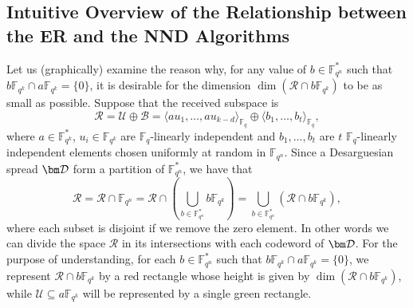 \documentclass{article}
\newcommand{\Fq}{\mathbb{F}_{q}}
\newcommand{\Fqn}{\mathbb{F}_{q^n}}
\newcommand{\Fqk}{\mathbb{F}_{q^k}}
\newcommand{\calB}{\mathcal{B}}
\newcommand{\calD}{\mathcal{D}}
\newcommand{\calR}{\mathcal{R}}
\newcommand{\calU}{\mathcal{U}}
\newcommand{\Span}[2]{\langle #2 \rangle_{#1}}
\begin{document}
\subsection{Intuitive Overview of the Relationship between the ER and the NND Algorithms}
\label{app: visual expl}
Let us (graphically) examine the reason why, for any value of $b \in \Fqn^*$ such that $b\Fqk\cap a\Fqk=\{0\}$, it is desirable for the dimension $\dim(\calR \cap b \Fqk)$ to be as small as possible. Suppose that the received subspace is $$\mathcal{R}=\calU\oplus\calB=\Span{\Fq}{au_1, \ldots, au_{k-d}} \oplus \Span{\Fq}{b_1, \ldots, b_{t}},$$
where $a \in\Fqk^* $, $u_i\in\Fqk$ are $\Fq$-linearly independent and $b_1, \ldots, b_{t}$ are $t$ $\Fq$-linearly independent elements chosen uniformly at random in $\mathbb{F}_{q^n}$. Since a Desarguesian spread $\bm  \calD$ form a partition of $\mathbb{F}_{q^n}^*$, we have that
\[
\mathcal{R}=\mathcal{R}\cap\mathbb{F}_{q^n}=\mathcal{R}\cap\left(\bigcup_{b\in\mathbb{F}_{q^n}^*}b\mathbb{F}_{q^k}\right)=\bigcup_{b\in\mathbb{F}_{q^n}^*}(\mathcal{R}\cap b\mathbb{F}_{q^k}),
\]
where each subset is disjoint if we remove the zero element.
In other words we can divide the space $\mathcal{R}$ in its intersections with each codeword of  $\bm  \calD$.  For the purpose of understanding, for each $b\in\Fqn^*$ such that $b\Fqk\cap a\Fqk=\{0\}$, we represent $\calR \cap b \Fqk$ by a red rectangle whose height is given by $\dim(\calR \cap b \Fqk)$, while $\calU \subseteq a \Fqk$ will be represented by a single green rectangle.
\end{document}
